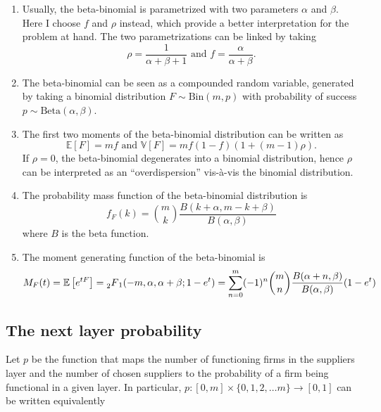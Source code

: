 \documentclass[american, abstract=on]{scrartcl}
\theoremstyle{plain}
\newcommand{\E}{\mathbb{E}}
\newcommand{\V}{\mathbb{V}}
\newcommand{\Beta}{\text{Beta}}
\newcommand{\Bin}{\text{Bin}}
\begin{document}
\begin{enumerate}
    \item Usually, the beta-binomial is parametrized with two parameters $\alpha$ and $\beta$. Here I choose $f$ and $\rho$ instead, which provide a better interpretation for the problem at hand. The two parametrizations can be linked by taking \begin{equation}
        \rho = \frac{1}{\alpha + \beta + 1} \text{ and } f = \frac{\alpha}{\alpha + \beta}.
    \end{equation}
    \item The beta-binomial can be seen as a compounded random variable, generated by taking a binomial distribution $F \sim \Bin(m, p)$ with probability of success $p \sim \Beta(\alpha, \beta)$.
    \item The first two moments of the beta-binomial distribution can be written as \begin{equation}
        \E[F] = m f \text{ and } \V[F] = m f (1 - f) (1 + (m - 1) \rho).
    \end{equation} If $\rho = 0$, the beta-binomial degenerates into a binomial distribution, hence $\rho$ can be interpreted as an ``overdispersion'' vis-à-vis the binomial distribution.
    \item The probability mass function of the beta-binomial distribution is \begin{equation} \label{eq:pmf_betabinomial}
        f_F(k) = \binom{m}{k} \frac{B(k + \alpha, m - k + \beta)}{B(\alpha, \beta)}
    \end{equation} where $B$ is the beta function. 
    \item The moment generating function of the beta-binomial is \begin{equation} \label{eq:mgf_betabinomial}
        M_F(t) = \E\left[ e^{tF} \right] = \prescript{}{2}{F}_1(-m, \alpha, \alpha + \beta; 1 - e^{t}) = \sum^m_{n = 0} (-1)^n \binom{m}{n} \frac{B(\alpha + n, \beta)}{B(\alpha, \beta)} (1 - e^t)
    \end{equation}
\end{enumerate}

\subsection{The next layer probability}

Let $p$ be the function that maps the number of functioning firms in the suppliers layer and the number of chosen suppliers to the probability of a firm being functional in a given layer. In particular, $p: [0, m] \times \{0, 1, 2, \ldots m\} \to [0, 1]$ can be written equivalently
\end{document}

